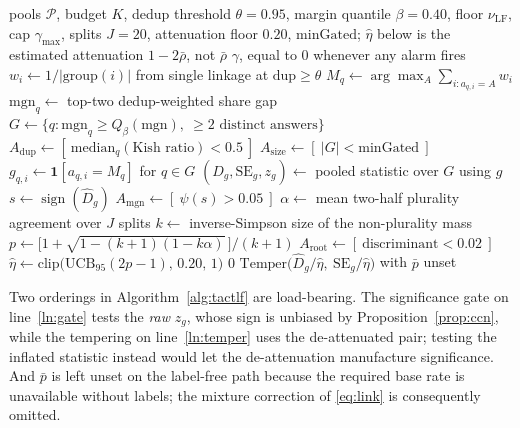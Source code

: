 \documentclass[conference]{IEEEtran}
\newcommand{\Dhat}{\widehat{D}}
\newcommand{\sign}{\operatorname{sign}}
\newcommand{\SC}{\textsc{sc}}
\newcommand{\TACT}{\textsc{tact}}
\begin{document}
\begin{algorithm}[t]
\caption{\TACT-LF: recovering the sign without labels}
\label{alg:tactlf}
\begin{algorithmic}[1]
\Require pools $\mathcal{P}$, budget $K$, dedup threshold $\theta{=}0.95$,
margin quantile $\beta{=}0.40$, floor $\nu_{\mathrm{LF}}$, cap $\gamma_{\max}$,
splits $J{=}20$, attenuation floor $0.20$, $\mathrm{minGated}$; $\hat\eta$ below is the
estimated attenuation $1-2\bar\rho$, not $\bar\rho$
\Ensure $\gamma$, equal to $0$ whenever any alarm fires
  \State $w_i\gets 1/|\text{group}(i)|$ from single linkage at $\mathrm{dup}\ge\theta$
  \State $M_q\gets\arg\max_A\sum_{i:a_{q,i}=A}w_i$ 
  \State $\mathrm{mgn}_q\gets$ top-two dedup-weighted share gap
\EndFor
\State $G\gets\{q:\mathrm{mgn}_q\ge Q_\beta(\mathrm{mgn}),\ \text{$\ge 2$ distinct answers}\}$
\State $A_{\mathrm{dup}}\gets[\ \mathrm{median}_q(\text{Kish ratio})<0.5\ ]$ 
\State $A_{\mathrm{size}}\gets[\ |G|<\mathrm{minGated}\ ]$
\State $g_{q,i}\gets\mathbf{1}[a_{q,i}=M_q]$ for $q\in G$
\State $(\Dhat_g,\mathrm{SE}_g,z_g)\gets$ pooled statistic over $G$ using $g$
\State $s\gets\sign(\Dhat_g)$ 
\State $A_{\mathrm{mgn}}\gets[\ \psi(s)>0.05\ ]$ 
\State $\alpha\gets$ mean two-half plurality agreement over $J$ splits
\State $k\gets$ inverse-Simpson size of the non-plurality mass
\State $p\gets\big[1+\sqrt{1-(k{+}1)(1-k\alpha)}\,\big]/(k{+}1)$
\State $A_{\mathrm{root}}\gets[\ \text{discriminant}<0.02\ ]$ 
\State $\hat\eta\gets\mathrm{clip}\big(\mathrm{UCB}_{95}(2p-1),\,0.20,\,1\big)$
 \label{ln:gate}
  \State \Return $0$ \Comment{refuse; the vote stays \SC}
\EndIf
\State \Return $\mathrm{Temper}\big(\Dhat_g/\hat\eta,\ \mathrm{SE}_g/\hat\eta\big)$ with $\bar p$ unset \label{ln:temper}
\end{algorithmic}
\end{algorithm}

Two orderings in Algorithm~\ref{alg:tactlf} are load-bearing. The significance
gate on line~\ref{ln:gate} tests the \emph{raw} $z_g$, whose sign is unbiased by
Proposition~\ref{prop:ccn}, while the tempering on line~\ref{ln:temper} uses
the de-attenuated pair; testing the inflated statistic instead would let the
de-attenuation manufacture significance. And $\bar p$ is left unset on the
label-free path because the required base rate is unavailable without labels;
the mixture correction of \eqref{eq:link} is consequently omitted.
\end{document}
